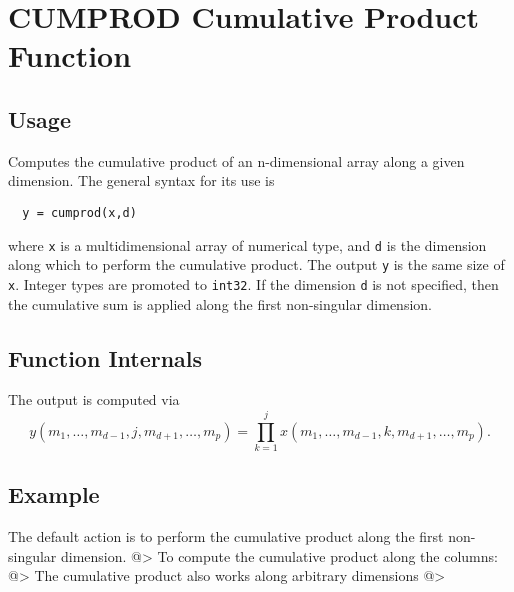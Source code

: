 \section{CUMPROD Cumulative Product Function}

\subsection{Usage}

Computes the cumulative product of an n-dimensional array along a given
dimension.  The general syntax for its use is
\begin{verbatim}
  y = cumprod(x,d)
\end{verbatim}
where \verb|x| is a multidimensional array of numerical type, and \verb|d|
is the dimension along which to perform the cumulative product.  The
output \verb|y| is the same size of \verb|x|.  Integer types are promoted
to \verb|int32|. If the dimension \verb|d| is not specified, then the
cumulative sum is applied along the first non-singular dimension.
\subsection{Function Internals}

The output is computed via
\[
  y(m_1,\ldots,m_{d-1},j,m_{d+1},\ldots,m_{p}) = 
  \prod_{k=1}^{j} x(m_1,\ldots,m_{d-1},k,m_{d+1},\ldots,m_{p}).
\]
\subsection{Example}

The default action is to perform the cumulative product along the
first non-singular dimension.
@>
To compute the cumulative product along the columns:
@>
The cumulative product also works along arbitrary dimensions
@>
